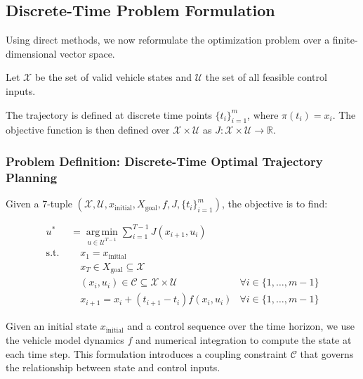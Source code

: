 \subsection{Discrete-Time Problem Formulation}

Using direct methods, we now reformulate the optimization problem over a finite-dimensional vector space.

Let $\mathcal{X}$ be the set of valid vehicle states and $\mathcal{U}$ the set of all feasible control inputs.

The trajectory is defined at discrete time points $\{t_i\}_{i=1}^{m}$, where $\pi(t_i) = x_i$.
The objective function is then defined over $\mathcal{X} \times \mathcal{U}$ as $J: \mathcal{X} \times \mathcal{U} \to \mathbb{R}$.

\subsubsection{Problem Definition: Discrete-Time Optimal Trajectory Planning}

Given a 7-tuple $(\mathcal{X}, \mathcal{U}, x_{\text{initial}}, X_{\text{goal}}, f, J, \{t_i\}_{i=1}^{m})$, the objective is to find:

\begin{align}
	u^* & = \underset{u \in \mathcal{U}^{T-1}}{\operatorname{arg\,min}} \sum_{i=1}^{T-1}
	J(x_{i+1}, u_{i})                                                                                                                                      \\ \text{s.t.
	}   & \quad x_1 = x_{\text{initial}}                                                                                                                   \\
	    & \quad x_T \in X_{\text{goal}} \subseteq \mathcal{X}                                                                                              \\
	    & \quad (x_i, u_i) \in \mathcal{C} \subseteq \mathcal{X} \times \mathcal{U}      & \forall i \in \{1, \dots, m-1\} \label{eq:coupling_constraints} \\
	    & \quad x_{i+1} = x_i + (t_{i+1} - t_i) f(x_i, u_i)                              & \forall i \in \{1, \dots, m-1\} \label{eq:discrete_dynamics}
\end{align}

Given an initial state $x_{\text{initial}}$ and a control sequence over the time horizon, we use the vehicle model dynamics $f$ and numerical
integration to compute the state at each time step.
This formulation introduces a coupling constraint $\mathcal{C}$ that governs the relationship between state and control inputs.

